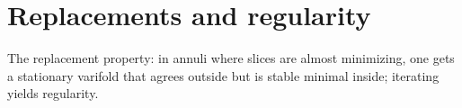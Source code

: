 \chapter{Replacements and regularity}

The replacement property: in annuli where slices are almost minimizing, one gets a stationary varifold that agrees outside but is stable minimal inside; iterating yields regularity. 
